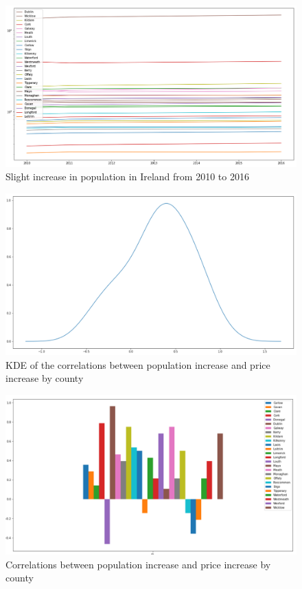 \documentclass[twocolumn]{article}
\begin{document}
\begin{figure}[h]
	\centering
	\includegraphics[scale=0.5]{media/population_increase.png}
	\caption{Slight increase in population in Ireland from 2010 to 2016}
	\label{fig5}
\end{figure}

\begin{figure}[h]
	\centering
	\includegraphics[scale=0.5]{media/correlations_between_population_and_price.png}
	\caption{KDE of the correlations between population increase and price increase by county}
	\label{fig6}
\end{figure}

\begin{figure}[h]
	\centering
	\includegraphics[scale=0.5]{media/correlations_between_population_and_price_by_county.png}
	\caption{Correlations between population increase and price increase by county}
	\label{fig7}
\end{figure}
\end{document}
